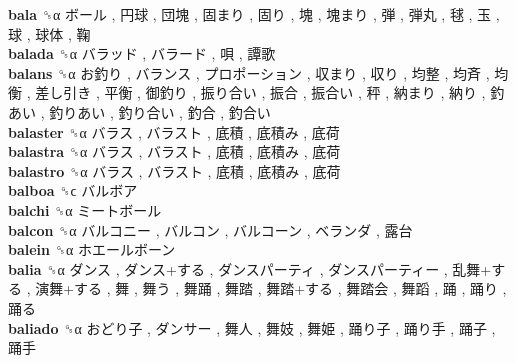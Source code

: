 \textbf{bala} ␝α   ボール ,  円球 ,  団塊 ,  固まり ,  固り ,  塊 ,  塊まり ,  弾 ,  弾丸 ,  毬 ,  玉 ,  球 ,  球体 ,  鞠   \\
\textbf{balada} ␝α   バラッド ,  バラード ,  唄 ,  譚歌   \\
\textbf{balans} ␝α   お釣り ,  バランス ,  プロポーション ,  収まり ,  収り ,  均整 ,  均斉 ,  均衡 ,  差し引き ,  平衡 ,  御釣り ,  振り合い ,  振合 ,  振合い ,  秤 ,  納まり ,  納り ,  釣あい ,  釣りあい ,  釣り合い ,  釣合 ,  釣合い   \\
\textbf{balaster} ␝α   バラス ,  バラスト ,  底積 ,  底積み ,  底荷   \\
\textbf{balastra} ␝α   バラス ,  バラスト ,  底積 ,  底積み ,  底荷   \\
\textbf{balastro} ␝α   バラス ,  バラスト ,  底積 ,  底積み ,  底荷   \\
\textbf{balboa} ␝ϲ   バルボア   \\
\textbf{balchi} ␝α   ミートボール   \\
\textbf{balcon} ␝α   バルコニー ,  バルコン ,  バルコーン ,  ベランダ ,  露台   \\
\textbf{balein} ␝α   ホエールボーン   \\
\textbf{balia} ␝α   ダンス ,  ダンス+する ,  ダンスパーティ ,  ダンスパーティー ,  乱舞+する ,  演舞+する ,  舞 ,  舞う ,  舞踊 ,  舞踏 ,  舞踏+する ,  舞踏会 ,  舞蹈 ,  踊 ,  踊り ,  踊る   \\
\textbf{baliado} ␝α   おどり子 ,  ダンサー ,  舞人 ,  舞妓 ,  舞姫 ,  踊り子 ,  踊り手 ,  踊子 ,  踊手   \\
